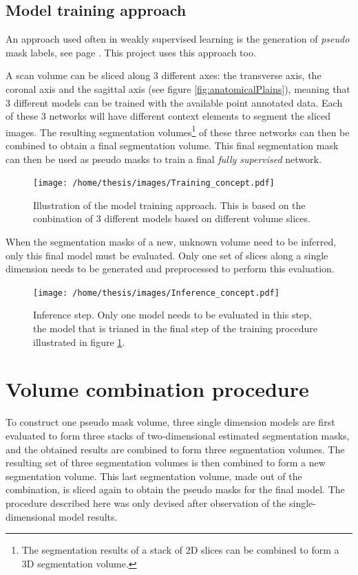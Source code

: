 \subsection{Model training approach}
\par{
An approach used often in weakly supervised learning is the generation of \textit{pseudo} mask labels\cite{Laradji2019,Laradji2019a, Ahn2019,McEver2020}, see page \pageref{sec:PreviousWork_weaklySupervised}.
This project uses this approach too.
}
\par{
A scan volume can be sliced along 3 different axes: the transverse axis, the coronal axis and the sagittal axis (see figure \ref{fig:anatomicalPlains}), meaning that 3 different models can be trained with the available point annotated data. 
Each of these 3 networks will have different context elements to segment the sliced images.
The resulting segmentation volumes\footnote{The segmentation results of a stack of 2D slices can be combined to form a 3D segmentation volume.} of these three networks can then be combined to obtain a final segmentation volume.
This final segmentation mask can then be used as pseudo masks to train a final \textit{fully supervised} network. 
}


\begin{figure}
    \centering
    \texttt{[image: /home/thesis/images/Training\_concept.pdf]}
    \caption{\label{fig:model_training_concept}Illustration of the model training approach. 
    This is based on the conbination of 3 different models based on different volume slices.}
\end{figure}

When the segmentation masks of a new, unknown volume need to be inferred, only this final model must be evaluated.
Only one set of slices along a single dimension needs to be generated and preprocessed to perform this evaluation.

\begin{figure}
    \centering
    \texttt{[image: /home/thesis/images/Inference\_concept.pdf]}
    \caption{Inference step. Only one model needs to be evaluated in this step, the model that is trianed in the final step of the training procedure illustrated in figure \ref{fig:model_training_concept}.}
\end{figure}

\section{Volume combination procedure\label{sec:combinationProcedure}}
To construct one pseudo mask volume, three single dimension models are first evaluated to form three stacks of two-dimensional estimated segmentation masks, and the obtained results are combined to form three segmentation volumes. 
The resulting set of three segmentation volumes is then combined to form a new segmentation volume.
This last segmentation volume, made out of the combination, is sliced again to obtain the pseudo masks for the final model.
The procedure described here was only devised after observation of the single-dimensional model results.

